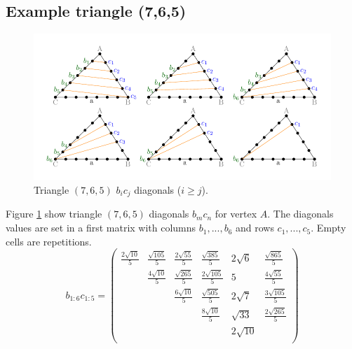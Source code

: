 \documentclass[11pt]{article}
\begin{document}
\newcommand\five{\colorbox{green}{$5$}}

\subsection{Example triangle (7,6,5)}

\begin{figure}[htp]
\centering
\includegraphics[scale=1]{t765bc}
\caption{Triangle $(7,6,5)$ $b_ic_j$ diagonals ($i \ge j$).}
\label{t765bc}
\end{figure}
Figure \ref{t765bc} show triangle $(7,6,5)$ diagonals $b_mc_n$ for vertex $A$.
The diagonals values are set in a first matrix with columns $b_1,...,b_6$ and rows $c_1,...,c_5$. Empty cells are repetitions.
\begin{equation}\label{eq:appendrow}
b_{1:6}c_{1:5} = \left(\begin{array}{cccccc}
\frac{2\sqrt{10}}{5} & \frac{\sqrt{105}}{5} & \frac{2\sqrt{55}}{5} & \frac{\sqrt{385}}{5} & 2\sqrt{6} & \frac{\sqrt{865}}{5} \\
& \frac{4\sqrt{10}}{5} & \frac{\sqrt{265}}{5} & \frac{2\sqrt{105}}{5} & 5 & \frac{4\sqrt{55}}{5} \\
& & \frac{6\sqrt{10}}{5} & \frac{\sqrt{505}}{5} & 2\sqrt{7} & \frac{3\sqrt{105}}{5} \\
& & & \frac{8\sqrt{10}}{5} & \sqrt{33} & \frac{2\sqrt{265}}{5} \\
& & & & 2\sqrt{10} & \\
\end{array}\right)
\end{equation}
\end{document}
